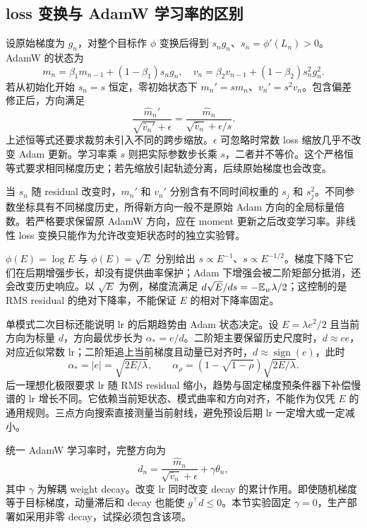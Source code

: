 \subsection{loss 变换与 AdamW 学习率的区别}

设原始梯度为 $g_n$，对整个目标作 $\phi$ 变换后得到 $s_ng_n$、$s_n=\phi'(L_n)>0$。AdamW 的状态为
\begin{equation}
m_n=\beta_1m_{n-1}+(1-\beta_1)s_ng_n,\quad
v_n=\beta_2v_{n-1}+(1-\beta_2)s_n^2g_n^2.
\end{equation}
若从初始化开始 $s_n=s$ 恒定，零初始状态下 $m_n'=s m_n$、$v_n'=s^2v_n$。包含偏差修正后，方向满足
\begin{equation}
\frac{\widehat m_n'}{\sqrt{\widehat v_n'}+\epsilon}
=\frac{\widehat m_n}{\sqrt{\widehat v_n}+\epsilon/s}.
\end{equation}
上述恒等式还要求裁剪未引入不同的跨步缩放。$\epsilon$ 可忽略时常数 loss 缩放几乎不改变 Adam 更新。学习率乘 $s$ 则把实际参数步长乘 $s$，二者并不等价。这个严格恒等式要求相同梯度历史；若先缩放引起轨迹分离，后续原始梯度也会改变。

当 $s_n$ 随 residual 改变时，$m_n'$ 和 $v_n'$ 分别含有不同时间权重的 $s_j$ 和 $s_j^2$。不同参数坐标具有不同梯度历史，所得新方向一般不是原始 Adam 方向的全局标量倍数。若严格要求保留原 AdamW 方向，应在 moment 更新之后改变学习率。非线性 loss 变换只能作为允许改变矩状态时的独立实验臂。

$\phi(E)=\log E$ 与 $\phi(E)=\sqrt E$ 分别给出 $s\propto E^{-1}$、$s\propto E^{-1/2}$。梯度下降下它们在后期增强步长，却没有提供曲率保护；Adam 下增强会被二阶矩部分抵消，还会改变历史响应。以 $\sqrt E$ 为例，梯度流满足 $d\sqrt E/ds=-\mathbb E_w\lambda/2$；这控制的是 RMS residual 的绝对下降率，不能保证 $E$ 的相对下降率固定。

单模式二次目标还能说明 lr 的后期趋势由 Adam 状态决定。设 $E=\lambda e^2/2$ 且当前方向为标量 $d$，方向最优步长为 $\alpha_*=e/d$。二阶矩主要保留历史尺度时，$d\approx c e$，对应近似常数 lr；二阶矩追上当前梯度且动量已对齐时，$d\approx\operatorname{sign}(e)$，此时
\begin{equation}
\alpha_*=|e|=\sqrt{2E/\lambda},\qquad
\alpha_\rho=(1-\sqrt{1-\rho})\sqrt{2E/\lambda}.
\end{equation}
后一理想化极限要求 lr 随 RMS residual 缩小，趋势与固定梯度预条件器下补偿慢谱的 lr 增长不同。它依赖当前矩状态、模式曲率和方向对齐，不能作为仅凭 $E$ 的通用规则。三点方向搜索直接测量当前射线，避免预设后期 lr 一定增大或一定减小。

统一 AdamW 学习率时，完整方向为
\begin{equation}
d_n=\frac{\widehat m_n}{\sqrt{\widehat v_n}+\epsilon}+\gamma\theta_n,
\end{equation}
其中 $\gamma$ 为解耦 weight decay。改变 lr 同时改变 decay 的累计作用。即使随机梯度等于目标梯度，动量滞后和 decay 也能使 $g^\top d\le0$。本节实验固定 $\gamma=0$，生产部署如采用非零 decay，试探必须包含该项。

